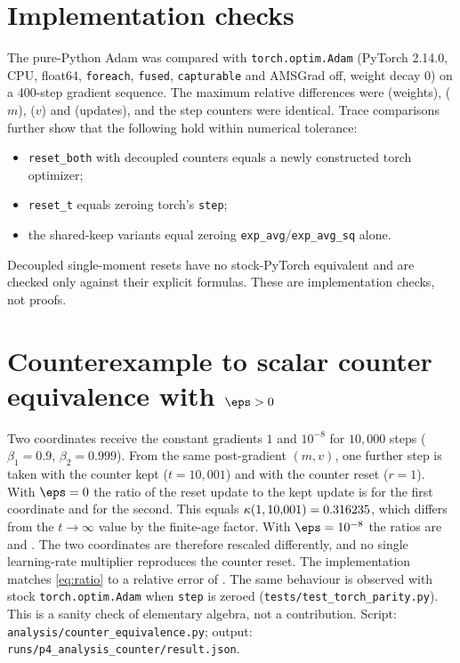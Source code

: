 \section{Implementation checks}
\label{app:checks}
The pure-Python Adam was compared with \texttt{torch.optim.Adam} (PyTorch 2.14.0, CPU, float64,
\texttt{foreach}, \texttt{fused}, \texttt{capturable} and AMSGrad off, weight decay 0) on a 400-step
gradient sequence. The maximum relative differences were \ParityW{} (weights), \ParityM{} ($m$),
\ParityV{} ($v$) and \ParityUpd{} (updates), and the step counters were identical. Trace comparisons
further show that the following hold within numerical tolerance:
\begin{itemize}
\item \texttt{reset\_both} with decoupled counters equals a newly constructed torch optimizer;
\item \texttt{reset\_t} equals zeroing torch's \texttt{step};
\item the shared-keep variants equal zeroing \texttt{exp\_avg}/\texttt{exp\_avg\_sq} alone.
\end{itemize}
Decoupled single-moment resets have no stock-PyTorch equivalent and are checked only against their
explicit formulas. These are implementation checks, not proofs.

\section{Counterexample to scalar counter equivalence with \texorpdfstring{$\eps>0$}{eps>0}}
\label{app:counterexample}
Two coordinates receive the constant gradients $1$ and $10^{-8}$ for $10{,}000$ steps
($\beta_1{=}0.9$, $\beta_2{=}0.999$). From the same post-gradient $(m,v)$, one further step is taken with
the counter kept ($t{=}10{,}001$) and with the counter reset ($r{=}1$). With $\eps=0$ the ratio of the
reset update to the kept update is \CeEpsZeroRatioA{} for the first coordinate and \CeEpsZeroRatioB{}
for the second. This equals $\kappa(1,10{,}001)=0.316235$, which differs from the $t\to\infty$ value
\CeKappaInf{} by the finite-age factor. With $\eps=10^{-8}$ the ratios are \CeRatioA{} and \CeRatioB{}.
The two coordinates are therefore rescaled differently, and no single learning-rate multiplier reproduces
the counter reset. The implementation matches \eqref{eq:ratio} to a relative error of \CeMaxErr{}.
The same behaviour is observed with stock \texttt{torch.optim.Adam} when \texttt{step} is zeroed
(\texttt{tests/test\_torch\_parity.py}). This is a sanity check of elementary algebra, not a
contribution. Script: \texttt{analysis/counter\_equivalence.py}; output:
\texttt{runs/p4\_analysis\_counter/result.json}.

